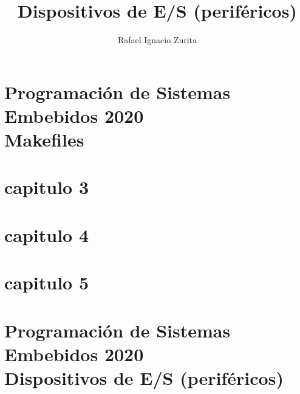 \documentclass[output=paper, 
colorlinks,
citecolor=brown,
newtxmath
]{langscibook}
\author{Rafael Ignacio Zurita\affiliation{Universidad Nacional del Comahue}}
\title{Dispositivos de E/S (periféricos)}
\begin{document}

\chapterfont{\Large\color{LightBlue}} 
\chapter*{Programación de Sistemas Embebidos 2020\\ Makefiles}
{\def\addcontentsline#1#2#3{}\maketitle}
\chapter*{capitulo 3}
{\def\addcontentsline#1#2#3{}\maketitle}
\chapter*{capitulo 4}
{\def\addcontentsline#1#2#3{}\maketitle}
\chapter*{capitulo 5}
{\def\addcontentsline#1#2#3{}\maketitle}

\chapter*{Programación de Sistemas Embebidos 2020\\ Dispositivos de E/S (periféricos)}

\begingroup
\let\clearpage\relax
\cleardoublepage
\hypersetup{linkcolor=blue}
\tableofcontents
\let\clearpage\relax
\cleardoublepage
\endgroup



{\def\addcontentsline#1#2#3{}\maketitle}


\setcounter{page}{1}
\end{document}
